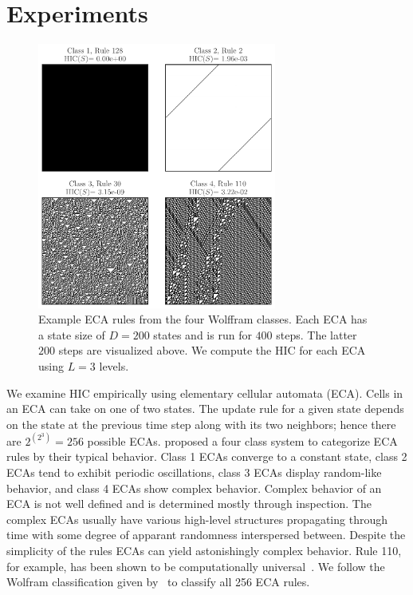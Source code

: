 \section{Experiments}

\begin{figure}[ht]
\centering
\includegraphics[width=0.7\textwidth]{figures/eca_images_and_hic}
\caption{Example ECA rules from the four Wolffram classes. Each ECA has a state
    size of $D=200$ states and is run for $400$ steps. The latter $200$ steps
    are visualized above. We compute the HIC for each ECA using $L=3$ levels.}
\label{fig:eca_images_and_hic}
\end{figure}

We examine HIC empirically using elementary cellular automata (ECA). Cells in
an ECA can take on one of two states. The update rule for a given state depends
on the state at the previous time step along with its two neighbors; hence
there are $2^{(2^3)} = 256$ possible ECAs. \citet{wolfram1983} proposed a four
class system to categorize ECA rules by their typical behavior. Class 1 ECAs
converge to a constant state, class 2 ECAs tend to exhibit periodic
oscillations, class 3 ECAs display random-like behavior, and class 4 ECAs show
complex behavior.  Complex behavior of an ECA is not well defined and is
determined mostly through inspection. The complex ECAs usually have various
high-level structures propagating through time with some degree of apparant
randomness interspersed between.  Despite the simplicity of the rules ECAs can
yield astonishingly complex behavior. Rule 110, for example, has been shown to
be computationally universal~\citep{cook2004universality}. We follow the
Wolfram classification given by~\citet[table 2]{martinez2013note} to classify
all 256 ECA rules.

